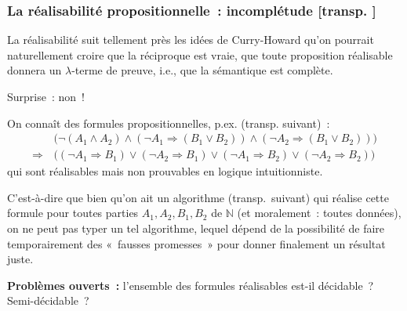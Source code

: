 \documentclass[mathserif,a4paper,aspectratio=169]{beamer}
\renewcommand{\frametitle}[1]{\subsubsection*{#1 {\footnotesize[transp. \insertframenumber]}}}
\begin{document}
\begin{frame}
\frametitle{La réalisabilité propositionnelle : incomplétude}

La réalisabilité suit tellement près les idées de Curry-Howard qu'on
pourrait naturellement croire que la réciproque est vraie, que toute
proposition réalisable donnera un $\lambda$-terme de preuve, i.e., que
la sémantique est complète.

\medskip

\alert{Surprise : non !}

\medskip

On connaît des formules propositionnelles, p.ex. (transp. suivant) :
\[
\begin{aligned}
&\Big(\neg (A_1 \land A_2) \land (\neg A_1 \Rightarrow (B_1 \lor B_2))
  \land (\neg A_2 \Rightarrow (B_1 \lor B_2))\Big)\\
\Rightarrow\,& \Big((\neg A_1 \Rightarrow B_1)\lor(\neg A_2 \Rightarrow B_1)\lor(\neg
  A_1 \Rightarrow B_2)\lor(\neg A_2 \Rightarrow B_2)\Big)
\end{aligned}
\]
qui sont réalisables mais non prouvables en logique intuitionniste.

\smallskip

{\footnotesize C'est-à-dire que bien qu'on ait un algorithme
  (transp. suivant) qui réalise cette formule pour toutes parties
  $A_1,A_2,B_1,B_2$ de $\mathbb{N}$ (et moralement : toutes données),
  on ne peut pas typer un tel algorithme, lequel dépend de la
  possibilité de faire temporairement des « fausses promesses » pour
  donner finalement un résultat juste.\par}

\medskip

\textbf{Problèmes ouverts :} l'ensemble des formules réalisables
est-il décidable ?  Semi-décidable ?

\end{frame}
%
\end{document}
